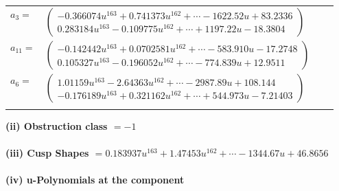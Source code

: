 \documentclass[1p]{elsarticle_modified}
\theoremstyle{definition}
\begin{document}
\begin{tabular}{m{7pt} m{180pt} m{7pt} m{180pt} }
\flushright $a_{3}=$&$\begin{pmatrix}-0.366074 u^{163}+0.741373 u^{162}+\cdots-1622.52 u+83.2336\\0.283184 u^{163}-0.109775 u^{162}+\cdots+1197.22 u-18.3804\end{pmatrix}$ \\
\flushright $a_{11}=$&$\begin{pmatrix}-0.142442 u^{163}+0.0702581 u^{162}+\cdots-583.910 u-17.2748\\0.105327 u^{163}-0.196052 u^{162}+\cdots-774.839 u+12.9511\end{pmatrix}$ \\
\flushright $a_{6}=$&$\begin{pmatrix}1.01159 u^{163}-2.64363 u^{162}+\cdots-2987.89 u+108.144\\-0.176189 u^{163}+0.321162 u^{162}+\cdots+544.973 u-7.21403\end{pmatrix}$\\&\end{tabular}
\flushleft \textbf{(ii) Obstruction class $= -1$}\\~\\
\flushleft \textbf{(iii) Cusp Shapes $= 0.183937 u^{163}+1.47453 u^{162}+\cdots-1344.67 u+46.8656$}\\~\\
\newpage\renewcommand{\arraystretch}{1}
\flushleft \textbf{(iv) u-Polynomials at the component}\newline \\
\end{document}
